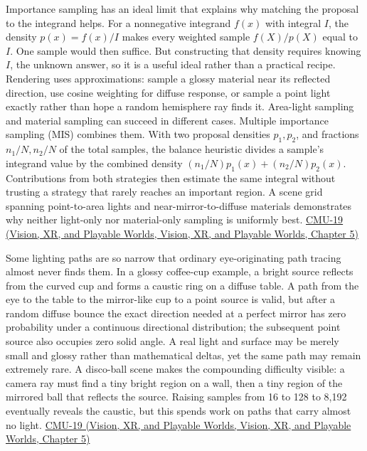 Importance sampling has an ideal limit that explains why matching the proposal to the integrand helps. For a nonnegative integrand \(f(x)\) with integral \(I\), the density \(p(x)=f(x)/I\) makes every weighted sample \(f(X)/p(X)\) equal to \(I\). One sample would then suffice. But constructing that density requires knowing \(I\), the unknown answer, so it is a useful ideal rather than a practical recipe. Rendering uses approximations: sample a glossy material near its reflected direction, use cosine weighting for diffuse response, or sample a point light exactly rather than hope a random hemisphere ray finds it. Area-light sampling and material sampling can succeed in different cases. Multiple importance sampling (MIS) combines them. With two proposal densities \(p_1,p_2\), and fractions \(n_1/N,n_2/N\) of the total samples, the balance heuristic divides a sample's integrand value by the combined density \((n_1/N)p_1(x)+(n_2/N)p_2(x)\). Contributions from both strategies then estimate the same integral without trusting a strategy that rarely reaches an important region. A scene grid spanning point-to-area lights and near-mirror-to-diffuse materials demonstrates why neither light-only nor material-only sampling is uniformly best. \href{../07-Vision-XR-and-Playable-Worlds/main.pdf\#nameddest=04-visual-computing-ii-ch036-cmu-19---variance-reduction}{CMU-19 (Vision, XR, and Playable Worlds, Vision, XR, and Playable Worlds, Chapter 5)}

Some lighting paths are so narrow that ordinary eye-originating path tracing almost never finds them. In a glossy coffee-cup example, a bright source reflects from the curved cup and forms a caustic ring on a diffuse table. A path from the eye to the table to the mirror-like cup to a point source is valid, but after a random diffuse bounce the exact direction needed at a perfect mirror has zero probability under a continuous directional distribution; the subsequent point source also occupies zero solid angle. A real light and surface may be merely small and glossy rather than mathematical deltas, yet the same path may remain extremely rare. A disco-ball scene makes the compounding difficulty visible: a camera ray must find a tiny bright region on a wall, then a tiny region of the mirrored ball that reflects the source. Raising samples from 16 to 128 to 8,192 eventually reveals the caustic, but this spends work on paths that carry almost no light. \href{../07-Vision-XR-and-Playable-Worlds/main.pdf\#nameddest=04-visual-computing-ii-ch036-cmu-19---variance-reduction}{CMU-19 (Vision, XR, and Playable Worlds, Vision, XR, and Playable Worlds, Chapter 5)}


